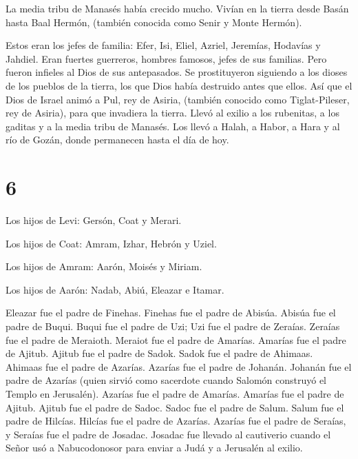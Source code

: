  La media tribu de Manasés había crecido mucho. Vivían en
la tierra desde Basán hasta Baal Hermón, (también conocida como Senir y
Monte Hermón).

 Estos eran los jefes de familia: Efer, Isi, Eliel, Azriel,
Jeremías, Hodavías y Jahdiel. Eran fuertes guerreros, hombres famosos,
jefes de sus familias.  Pero fueron infieles al Dios de sus
antepasados. Se prostituyeron siguiendo a los dioses de los pueblos de
la tierra, los que Dios había destruido antes que ellos. 
Así que el Dios de Israel animó a Pul, rey de Asiria, (también conocido
como Tiglat-Pileser, rey de Asiria), para que invadiera la tierra. Llevó
al exilio a los rubenitas, a los gaditas y a la media tribu de Manasés.
Los llevó a Halah, a Habor, a Hara y al río de Gozán, donde permanecen
hasta el día de hoy.

\hypertarget{section-5}{%
\section{6}\label{section-5}}

 Los hijos de Levi: Gersón, Coat y Merari.

 Los hijos de Coat: Amram, Izhar, Hebrón y Uziel.

 Los hijos de Amram: Aarón, Moisés y Miriam.

Los hijos de Aarón: Nadab, Abiú, Eleazar e Itamar.

 Eleazar fue el padre de Finehas. Finehas fue el padre de
Abisúa.  Abisúa fue el padre de Buqui. Buqui fue el padre de
Uzi;  Uzi fue el padre de Zeraías. Zeraías fue el padre de
Meraioth.  Meraiot fue el padre de Amarías. Amarías fue el
padre de Ajitub.  Ajitub fue el padre de Sadok. Sadok fue el
padre de Ahimaas.  Ahimaas fue el padre de Azarías. Azarías
fue el padre de Johanán.  Johanán fue el padre de Azarías
(quien sirvió como sacerdote cuando Salomón construyó el Templo en
Jerusalén).  Azarías fue el padre de Amarías. Amarías fue
el padre de Ajitub.  Ajitub fue el padre de Sadoc. Sadoc
fue el padre de Salum.  Salum fue el padre de Hilcías.
Hilcías fue el padre de Azarías.  Azarías fue el padre de
Seraías, y Seraías fue el padre de Josadac.  Josadac fue
llevado al cautiverio cuando el Señor usó a Nabucodonosor para enviar a
Judá y a Jerusalén al exilio.

